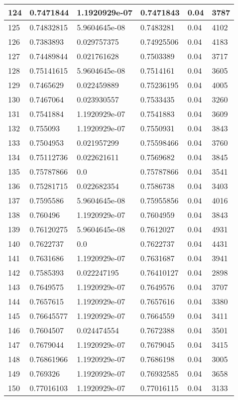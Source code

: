 \begin{longtable}{|l|l|l|l|l|l|}
124 & 0.7471844 & 1.1920929e-07 & 0.7471843 & 0.04 & 3787 \\ \hline 
125 & 0.74832815 & 5.9604645e-08 & 0.7483281 & 0.04 & 4102 \\ \hline 
126 & 0.7383893 & 0.029757375 & 0.74925506 & 0.04 & 4183 \\ \hline 
127 & 0.74489844 & 0.021761628 & 0.7503389 & 0.04 & 3717 \\ \hline 
128 & 0.75141615 & 5.9604645e-08 & 0.7514161 & 0.04 & 3605 \\ \hline 
129 & 0.7465629 & 0.022459889 & 0.75236195 & 0.04 & 4005 \\ \hline 
130 & 0.7467064 & 0.023930557 & 0.7533435 & 0.04 & 3260 \\ \hline 
131 & 0.7541884 & 1.1920929e-07 & 0.7541883 & 0.04 & 3609 \\ \hline 
132 & 0.755093 & 1.1920929e-07 & 0.7550931 & 0.04 & 3843 \\ \hline 
133 & 0.7504953 & 0.021957299 & 0.75598466 & 0.04 & 3760 \\ \hline 
134 & 0.75112736 & 0.022621611 & 0.7569682 & 0.04 & 3845 \\ \hline 
135 & 0.75787866 & 0.0 & 0.75787866 & 0.04 & 3541 \\ \hline 
136 & 0.75281715 & 0.022682354 & 0.7586738 & 0.04 & 3403 \\ \hline 
137 & 0.7595586 & 5.9604645e-08 & 0.75955856 & 0.04 & 4016 \\ \hline 
138 & 0.760496 & 1.1920929e-07 & 0.7604959 & 0.04 & 3843 \\ \hline 
139 & 0.76120275 & 5.9604645e-08 & 0.7612027 & 0.04 & 4931 \\ \hline 
140 & 0.7622737 & 0.0 & 0.7622737 & 0.04 & 4431 \\ \hline 
141 & 0.7631686 & 1.1920929e-07 & 0.7631687 & 0.04 & 3941 \\ \hline 
142 & 0.7585393 & 0.022247195 & 0.76410127 & 0.04 & 2898 \\ \hline 
143 & 0.7649575 & 1.1920929e-07 & 0.7649576 & 0.04 & 3707 \\ \hline 
144 & 0.7657615 & 1.1920929e-07 & 0.7657616 & 0.04 & 3380 \\ \hline 
145 & 0.76645577 & 1.1920929e-07 & 0.7664559 & 0.04 & 3411 \\ \hline 
146 & 0.7604507 & 0.024474554 & 0.7672388 & 0.04 & 3501 \\ \hline 
147 & 0.7679044 & 1.1920929e-07 & 0.7679045 & 0.04 & 3415 \\ \hline 
148 & 0.76861966 & 1.1920929e-07 & 0.7686198 & 0.04 & 3005 \\ \hline 
149 & 0.769326 & 1.1920929e-07 & 0.76932585 & 0.04 & 3658 \\ \hline 
150 & 0.77016103 & 1.1920929e-07 & 0.77016115 & 0.04 & 3133 \\ \hline 
\end{longtable}